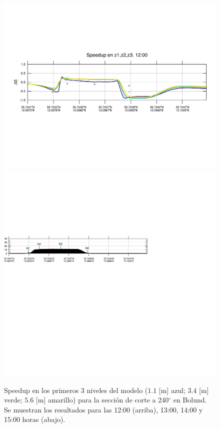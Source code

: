 \begin{figure}[H]
	\includegraphics[width=0.95\linewidth,trim={12mm 84mm 10mm 74mm},page=37,clip]{Imagenes/06/bol/speedup}\\%
	\includegraphics[width=0.95\linewidth,trim={-11mm 193mm 115mm 112mm},clip]{Imagenes/06/bol/cross_height}\\%
	\caption{Speedup en los primeros 3 niveles del modelo ($1.1$ [m] azul; $3.4$ [m] verde; $5.6$ [m] amarillo) para la sección de corte a 240$^\circ$ en Bolund. Se muestran los resultados para las 12:00 (arriba), 13:00, 14:00 y 15:00 horas (abajo).}
	\label{fig:06_bol_speedup}
\end{figure}


